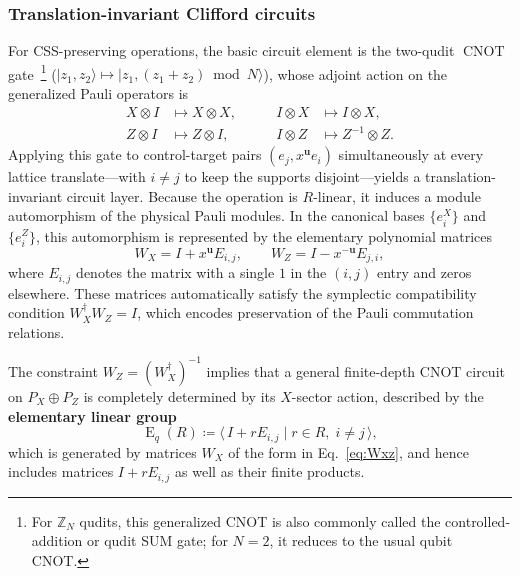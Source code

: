 \documentclass[aps,prx,english,superscriptaddress,twocolumn,tightenlines,showpacs,longbibliography,floatfix,amsfonts]{revtex4-2}
\theoremstyle{remark}
\theoremstyle{definition}
\begin{document}
\subsubsection{Translation-invariant Clifford circuits}
\label{subsubsec:TI-clifford}

For CSS-preserving operations, the basic circuit element is the two-qudit $\operatorname{CNOT}$ gate~\footnote{For $\mathbb Z_N$ qudits, this generalized CNOT is also commonly called the controlled-addition or qudit SUM gate; for $N=2$, it reduces to the usual qubit CNOT.}
($|z_1,z_2\rangle \mapsto |z_1, (z_1+z_2) \bmod N\rangle$), whose adjoint
action on the generalized Pauli operators is
\begin{equation}
	\begin{aligned}
		X \otimes I &\mapsto X \otimes X, \qquad & I \otimes X &\mapsto I \otimes X,\\
		Z \otimes I &\mapsto Z \otimes I, \qquad & I \otimes Z &\mapsto Z^{-1} \otimes Z .
	\end{aligned}
\end{equation}
Applying this gate to control-target pairs $(e_j, x^{\mathbf u} e_i)$ simultaneously at every lattice translate---with $i\neq j$ to keep the supports disjoint---yields a translation-invariant circuit layer. Because the operation is $R$-linear, it induces a module automorphism of the physical Pauli modules. In the canonical bases $\{e_i^X\}$ and $\{e_i^Z\}$, this automorphism is represented by the elementary polynomial matrices
\begin{equation}
	W_X = I + x^{\mathbf u} E_{i,j}, \qquad W_Z = I - x^{-\mathbf u} E_{j,i}, \label{eq:Wxz}
\end{equation}
where $E_{i,j}$ denotes the matrix with a single $1$ in the $(i,j)$ entry and zeros elsewhere. These matrices automatically satisfy the symplectic compatibility condition $W_X^\dagger W_Z = I$, which encodes preservation of the Pauli commutation relations.

The constraint  $W_Z = (W_X^\dagger)^{-1}$ implies that a general finite-depth CNOT circuit on $P_X \oplus P_Z$ is completely determined by its $X$-sector action, described by the \textbf{elementary linear group}
\begin{equation}
	\operatorname{E}_q(R) \coloneqq \bigl\langle\, I + rE_{i,j} \mid r\in R,\; i\neq j \,\bigr\rangle,
\end{equation}
which is generated by matrices $W_X$ of the form in Eq.~\eqref{eq:Wxz}, and hence includes matrices $I+rE_{i,j}$ as well as their finite products.
\end{document}
